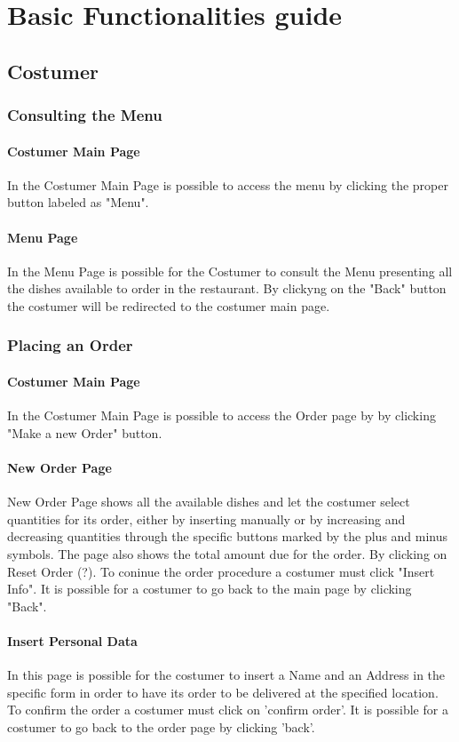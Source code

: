 \section{Basic Functionalities guide}
\subsection{Costumer}

\subsubsection{Consulting the Menu}
\paragraph{Costumer Main Page}
In the Costumer Main Page is possible to access the menu by clicking the proper button labeled as "Menu".
\paragraph{Menu Page }
In the Menu Page is possible for the Costumer to consult the Menu presenting all the dishes available to order in the restaurant.
By clickyng on the "Back" button the costumer will be redirected to the costumer main page.

\subsubsection{Placing an Order}
\paragraph{Costumer Main Page}
In the Costumer Main Page is possible to access the Order page by by clicking "Make a new Order" button.

\paragraph{New Order Page}
New Order Page shows all the available dishes and let the costumer select quantities for its order, either by inserting manually or by increasing and decreasing quantities through the specific buttons marked by the plus and minus symbols. The page also shows the total amount due for the order.
By clicking on Reset Order (?).
To coninue the order procedure a costumer must click "Insert Info". 
It is possible for a costumer to go back to the main page by clicking "Back".

\paragraph{Insert Personal Data}
In this page is possible for the costumer to insert a Name and an Address in the specific form in order to have its order to be delivered at the specified location. To confirm the order a costumer must click on 'confirm order'. 
It is possible for a costumer to go back to the order page by clicking 'back'.

